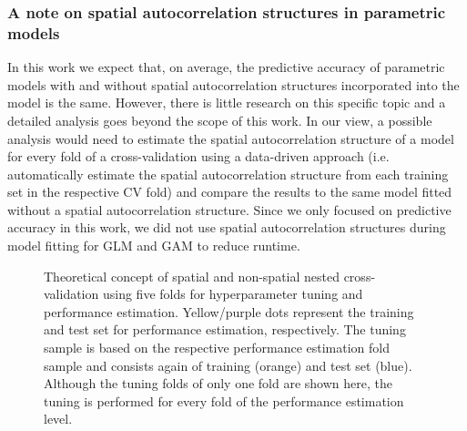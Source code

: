 \documentclass[review]{elsarticle}
\begin{document}
\subsubsection{A note on spatial autocorrelation structures in parametric models}
In this work we expect that, on average, the predictive accuracy of parametric models with and without spatial autocorrelation structures incorporated into the model is the same.
However, there is little research on this specific topic \citep{Dormann2007b, Mets2017} and a detailed analysis goes beyond the scope of this work.
In our view, a possible analysis would need to estimate the spatial autocorrelation structure of a model for every fold of a cross-validation using a data-driven approach (i.e. automatically estimate the spatial autocorrelation structure from each training set in the respective CV fold) and compare the results to the same model fitted without a spatial autocorrelation structure.
Since we only focused on predictive accuracy in this work, we did not use spatial autocorrelation structures during model fitting for \ac{GLM} and \ac{GAM} to reduce runtime.

\begin{figure} [t!]
	\begin{center}
		\caption[]{Theoretical concept of spatial and non-spatial nested cross-validation using five folds for hyperparameter tuning and performance estimation.
			Yellow/purple dots represent the training and test set for performance estimation, respectively.
			The tuning sample is based on the respective performance estimation fold sample and consists again of training (orange) and test set (blue).
			Although the tuning folds of only one fold are shown here, the tuning is performed for every fold of the performance estimation level.}
		\label{fig:nested_cv}
	\end{center}
\end{figure}
\end{document}
